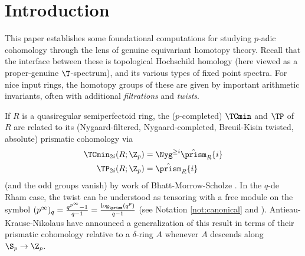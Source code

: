 %
\section{Introduction}
\label{sec:intro}

This paper establishes some foundational computations for studying $p$-adic cohomology through the lens of genuine equivariant homotopy theory. Recall that the interface between these is topological Hochschild homology (here viewed as a proper-genuine $\T$-spectrum), and its various types of fixed point spectra. For nice input rings, the homotopy groups of these are given by important arithmetic invariants, often with additional \emph{filtrations} and \emph{twists}.

\begin{example}
If $R$ is a quasiregular semiperfectoid ring, the ($p$-completed) $\TCmin$ and $\TP$ of $R$ are related to its (Nygaard-filtered, Nygaard-completed, Breuil-Kisin twisted, absolute) prismatic cohomology via
\begin{align*}
  \TCmin_{2i}(R;\Z_p) &= \Nyg^{\ge i}\hat\prism_R\{i\}\\
  \TP_{2i}(R;\Z_p) &= \hat\prism_R\{i\}
\end{align*}
(and the odd groups vanish) by work of Bhatt-Morrow-Scholze \cite{BMS2}. In the $q$-de Rham case, the twist can be understood as tensoring with a free module on the symbol $(p^\infty)_q = \frac{q^{p^\infty}-1}{q-1} = \frac{\log_\prism(q^p)}{q-1}$ (see Notation \ref{not:canonical} and \cite[Proposition 2.6.1]{APC}). Antieau-Krause-Nikolaus have announced a generalization of this result in terms of their prismatic cohomology relative to a $\delta$-ring $A$ \cite{RelativePrismatic} whenever $A$ descends along $\S_p\to\Z_p$.
\end{example}

